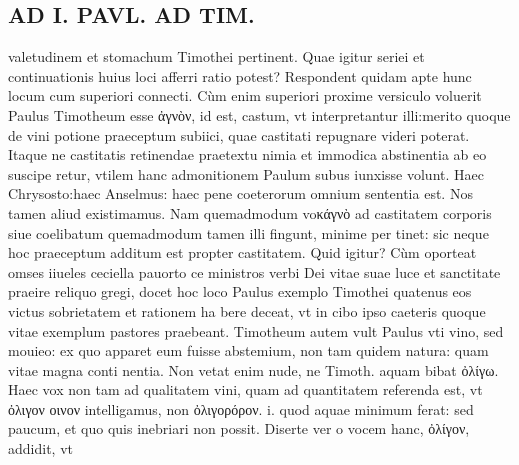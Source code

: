 \documentclass{article}
\begin{document}
\begin{pages}
\section*{AD I. PAVL. AD TIM. }
\marginpar{[ p.368 ]}\pstart valetudinem et stomachum Timothei pertinent. Quae igitur seriei et continuationis huius loci afferri ratio potest? Respondent quidam apte hunc locum cum superiori connecti. Cùm enim superiori proxime versiculo voluerit Paulus Timotheum esse ἀγνὸν, id est, castum, vt interpretantur illi:merito quoque de vini potione praeceptum subiici, quae castitati repugnare videri poterat. Itaque ne castitatis retinendae praetextu nimia et immodica abstinentia ab eo suscipe retur, vtilem hanc admonitionem Paulum subus  iunxisse volunt. Haec Chrysosto:haec Anselmus: haec pene coeterorum omnium sententia est. Nos tamen aliud existimamus. Nam quemadmodum voκάγνὸ ad castitatem corporis siue coelibatum quemadmodum tamen illi fingunt, minime per tinet: sic neque hoc praeceptum additum est propter castitatem. Quid igitur? Cùm oporteat omses iiueles ceciella pauorto ce ministros verbi Dei vitae suae luce et sanctitate praeire reliquo gregi, docet hoc loco Paulus exemplo Timothei quatenus eos victus sobrietatem et rationem ha bere deceat, vt in cibo ipso caeteris quoque vitae exemplum pastores praebeant.  \pend\pstart Timotheum autem vult Paulus vti vino, sed mouieo: ex quo apparet eum fuisse abstemium, non tam quidem natura: quam vitae magna conti nentia. Non vetat enim nude, ne Timoth. aquam bibat ὀλίγω. Haec vox non tam ad qualitatem vini, quam ad quantitatem referenda est, vt ὀλιγον οινον intelligamus, non ὀλιγορόρον. i. quod aquae minimum ferat: sed paucum, et quo quis inebriari non possit. Diserte ver o vocem hanc, ὀλίγον, addidit, vt  \pend

\end{pages}
\end{document}
